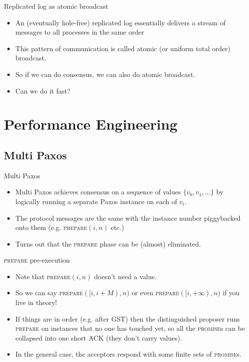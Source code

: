 \documentclass{beamer}
\begin{document}
\begin{frame}{Replicated log as atomic broadcast}
  \begin{itemize}
    \item An (eventually hole-free) replicated log essentially delivers a stream of messages to all processes \alert{in the same order}
    \item This pattern of communication is called \alert{atomic (or uniform total order) broadcast}.
    \item So if we can do consensus, we can also do atomic broadcast.
    \item Can we do it \alert{fast}?
  \end{itemize}
\end{frame}

\section{Performance Engineering}
\subsection{Multi Paxos}
\begin{frame}{Multi Paxos}
  \begin{itemize}
    \item Multi Paxos achieves consensus on a sequence of values $\{v_0, v_1, \ldots\}$ by logically running a separate Paxos instance on each of $v_i$.
    \item The protocol messages are the same with the instance number piggybacked onto them (e.g. \textsc{prepare}$(i, n)$ etc.)
    \item Turns out that the \textsc{prepare} phase can be (almost) eliminated.
  \end{itemize}
\end{frame}

\begin{frame}{\textsc{prepare} pre-execution}
  \begin{itemize}
    \item Note that \textsc{prepare}$(i, n)$ doesn't need a value.
    \item So we can say \textsc{prepare}$([i, i+M), n)$ or even \textsc{prepare}$([i, +\infty), n)$ if you live in theory!
    \item If things are in order (e.g. after GST) then the distinguished proposer runs \textsc{prepare} on instances that no one has touched yet, so all the \textsc{promise}s can be collapsed into one short \textsc{ACK} (they don't carry values).
    \item In the general case, the acceptors respond with some finite sets of \textsc{promise}s.
  \end{itemize}
\end{frame}
\end{document}
